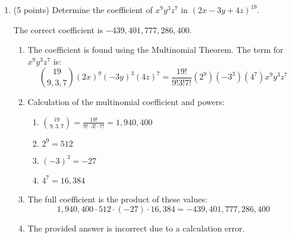 \documentclass{article}
\begin{document}
\begin{enumerate}
  \newpage

  \item (5 points) Determine the coefficient of $x^9 y^3 z^7$ in $(2 x-3 y+4 z)^{19}$.
  \begin{answer}
    The correct coefficient is $-439,401,777,286,400$.
    \begin{enumerate}
      \item The coefficient is found using the Multinomial Theorem. The term for $x^9 y^3 z^7$ is:
      $$
      \binom{19}{9, 3, 7} (2x)^9 (-3y)^3 (4z)^7 = \frac{19!}{9!3!7!} (2^9) (-3^3) (4^7) x^9 y^3 z^7
      $$
      \item Calculation of the multinomial coefficient and powers:
      \begin{enumerate}
        \item $\binom{19}{9, 3, 7} = \frac{19!}{9! \cdot 3! \cdot 7!} = 1,940,400$
        \item $2^9 = 512$
        \item $(-3)^3 = -27$
        \item $4^7 = 16,384$
      \end{enumerate}
      \item The full coefficient is the product of these values:
      $$
      1,940,400 \cdot 512 \cdot (-27) \cdot 16,384 = -439,401,777,286,400
      $$
      \item The provided answer is incorrect due to a calculation error.
    \end{enumerate}
  \end{answer}

  

  \newpage


\end{enumerate}
\end{document}

